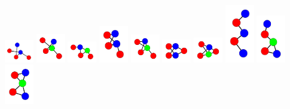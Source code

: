 \documentclass[openany]{tufte-book} %
\theoremstyle{plain}
\begin{document}
\begin{marginfigure}
		\includegraphics[width=0.5in]{graphs/all/0011001010.pdf}
		\includegraphics[width=0.5in]{graphs/all/0011001011.pdf}
		\includegraphics[width=0.5in]{graphs/all/0011010011.pdf}
		\includegraphics[width=0.5in]{graphs/all/0011011010.pdf}
		\includegraphics[width=0.5in]{graphs/all/0011011011.pdf}
		\includegraphics[width=0.5in]{graphs/all/0011011110.pdf}
		\includegraphics[width=0.5in]{graphs/all/0011011111.pdf}
		\includegraphics[width=0.5in]{graphs/all/0101011000.pdf}
		\includegraphics[width=0.5in]{graphs/all/0101011010.pdf}
		\includegraphics[width=0.5in]{graphs/all/0101011011.pdf}

\end{marginfigure}
\end{document}
